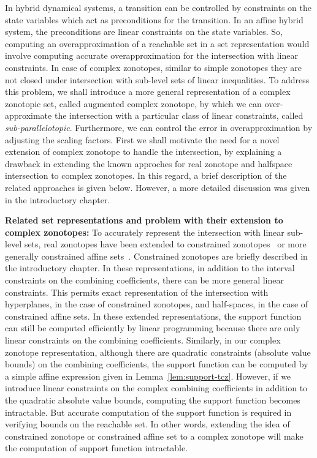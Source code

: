 In hybrid dynamical systems, a transition can be controlled by
constraints on the state variables which act as preconditions for the
transition.  In an affine hybrid system, the preconditions are linear
constraints on the state variables.  So, computing an
overapproximation of a reachable set in a set representation would
involve computing accurate overapproximation for the intersection with
linear constraints.  In case of complex zonotopes, similar to simple
zonotopes they are not closed under intersection with sub-level sets
of linear inequalities.  To address this problem, we shall introduce a
more general representation of a complex zonotopic set, called
augmented complex zonotope, by which we can over-approximate the
intersection with a particular class of linear constraints, called
\emph{sub-parallelotopic}.  Furthermore, we can control the error in
overapproximation by adjusting the scaling factors.  First we shall
motivate the need for a novel extension of complex zonotope to handle
the intersection, by explaining a drawback in extending the known
approches for real zonotope and halfspace intersection to complex
zonotopes.  In this regard, a brief description of the related
approaches is given below.  However, a more detailed discussion was
given in the introductory chapter.

{\bf Related set representations and problem with their extension to complex
zonotopes: } To accurately represent the intersection with linear
sub-level sets, real zonotopes have been extended to constrained
zonotopes~\cite{scott2016constrained} or more generally constrained
affine sets~\cite{Ghorbal2010}.  Constrained zonotopes are briefly
described in the introductory chapter.  In these representations, in
addition to the interval constraints on the combining coefficients,
there can be more general linear constraints.  This permits exact
representation of the intersection with hyperplanes, in the case of
constrained zonotopes, and half-spaces, in the case of constrained
affine sets.  In these extended representations, the support function
can still be computed efficiently by linear programming because there are
only linear constraints on the combining coefficients.  Similarly, in
our complex zonotope representation, although there are quadratic
constraints (absolute value bounds) on the combining coefficients, the
support function can be computed by a simple affine expression given
in Lemma~\ref{lem:support-tcz}.  However, if we introduce linear
constraints on the complex combining coefficients in addition to the
quadratic absolute value bounds, computing the support function
becomes intractable.  But accurate computation of the support function
is required in verifying bounds on the reachable set.  In other words,
extending the idea of constrained zonotope or constrained affine set
to a complex zonotope will make the computation of support function
intractable.

